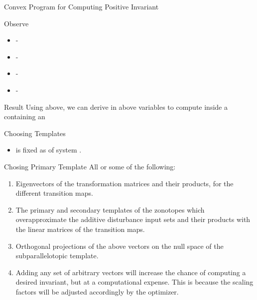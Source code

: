 \begin{frame}{Convex Program for Computing Positive Invariant}


\begin{block}{Observe}
\begin{itemize}
\item {} - 
\item {} - 
\item {} - 
\item {} - 
\end{itemize}
\end{block}
\pause
\begin{alertblock}{Result}
{Using above, we can derive  in
above variables to compute  inside
a  containing  an }
\end{alertblock}

\end{frame}

\begin{frame}{Choosing Templates}
\begin{itemize}
\item {} is fixed as  of system .\pause
\end{itemize}
\begin{block}{Chosing Primary Template}
All or some of the following:\pause
\begin{enumerate}
\item Eigenvectors of the transformation matrices and their products, for
   the different transition maps.  \pause  
\item  The primary and
   secondary templates of the zonotopes which overapproximate the
   additive disturbance input sets and their products with the linear
   matrices of the transition maps.  \pause
\item
   Orthogonal projections of the above vectors on the null space of
   the subparallelotopic template.  \pause
\item Adding any set of arbitrary vectors will increase the
   chance of computing a desired invariant, but at a computational
   expense.  This is because the scaling factors will be adjusted
   accordingly by the optimizer.
\end{enumerate}
\end{block}
\end{frame}



